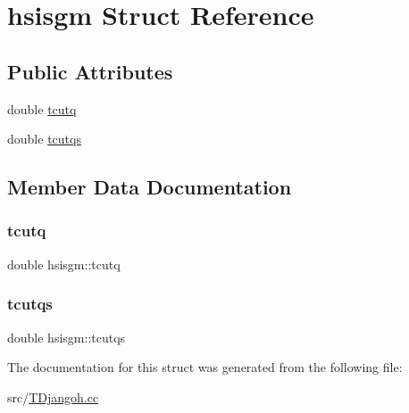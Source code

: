 \hypertarget{structhsisgm}{}\section{hsisgm Struct Reference}
\label{structhsisgm}
\subsection*{Public Attributes}
\begin{DoxyCompactItemize}
\item 
double \hyperlink{structhsisgm_ad097543cbe50fed54b4e6739858c4b71}{tcutq}
\item 
double \hyperlink{structhsisgm_aab15dd2383296b67bb7ed7b76c909970}{tcutqs}
\end{DoxyCompactItemize}


\subsection{Member Data Documentation}
\mbox{\label{structhsisgm_ad097543cbe50fed54b4e6739858c4b71}} 
\subsubsection{\texorpdfstring{tcutq}{tcutq}}
{\footnotesize\ttfamily double hsisgm\+::tcutq}

\mbox{\label{structhsisgm_aab15dd2383296b67bb7ed7b76c909970}} 
\subsubsection{\texorpdfstring{tcutqs}{tcutqs}}
{\footnotesize\ttfamily double hsisgm\+::tcutqs}



The documentation for this struct was generated from the following file\+:\begin{DoxyCompactItemize}
\item 
src/\hyperlink{_t_djangoh_8cc}{T\+Djangoh.\+cc}\end{DoxyCompactItemize}
